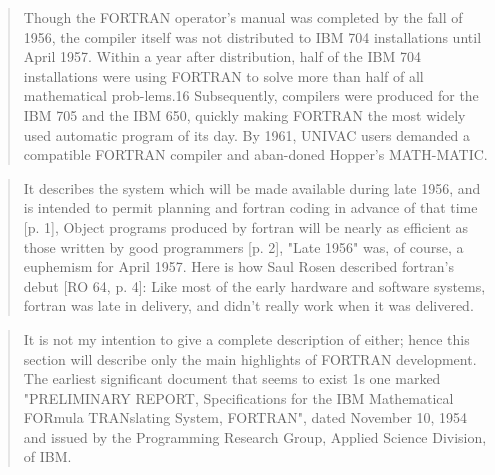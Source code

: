 
\begin{quotation}
Though the FORTRAN operator's manual was completed by the fall of 1956, the 
compiler itself was not distributed to IBM 704 installations until April 1957. 
Within a year after distribution, half of the IBM 704 installations were using 
FORTRAN to solve more than half of all mathematical prob-lems.16 Subsequently, 
compilers were produced for the IBM 705 and the IBM 650, quickly making FORTRAN 
the most widely used automatic program of its day. By 1961, UNIVAC users 
demanded a compatible FORTRAN compiler and aban-doned Hopper's MATH-MATIC.
\cite{grace_hopper_and_the_invention_of_the_information_age_2009}
\end{quotation}

\begin{quotation}
It describes the system which will be made available during late 1956, and is 
intended to permit planning and fortran coding in advance of that time [p. 1], 
Object programs produced by fortran will be nearly as efficient as those 
written by good programmers [p. 2], "Late 1956" was, of course, a euphemism for 
April 1957. Here is how Saul Rosen described fortran's debut [RO 64, p. 4]: Like 
most of the early hardware and software systems, fortran was late in delivery, 
and didn't really work when it was delivered.
\cite{history_of_computing_in_the_twentieth_century_1980}
\end{quotation}

\begin{quotation}
It is not my intention to give a complete description of either; hence this 
section will describe only the main highlights of FORTRAN development. The 
earliest significant document that seems to exist 1s one marked
"PRELIMINARY REPORT, Specifications for the IBM Mathematical FORmula 
TRANslating System, FORTRAN", dated November 10, 1954 and issued by the 
Programming Research Group, Applied Science Division, of IBM. 
\cite{sammet_programming_languages_history_and_fundamentals_1969}
\end{quotation}

